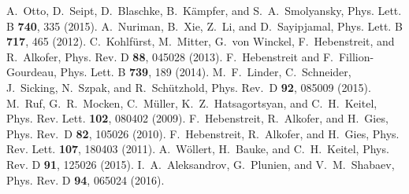 \documentclass[preprint,aps,prd,showpacs,floatfix]{revtex4-1}
\begin{document}
\begin{thebibliography}{99}
%
 A.~Otto, D.~Seipt, D.~Blaschke, B.~K\"ampfer, and S.~A.~Smolyansky, Phys. Lett. B {\bf 740}, 335 (2015).
%
 A.~Nuriman, B.~Xie, Z.~Li, and D.~Sayipjamal, Phys. Lett. B {\bf 717}, 465 (2012).
%
 C.~Kohlf\"urst, M.~Mitter, G.~von Winckel, F.~Hebenstreit, and R.~Alkofer, Phys. Rev. D {\bf 88}, 045028 (2013).
%
 F.~Hebenstreit and F.~Fillion-Gourdeau, Phys. Lett. B {\bf 739}, 189 (2014).
%
 M.~F.~Linder, C.~Schneider, J.~Sicking, N.~Szpak, and R.~Sch\"utzhold, Phys. Rev.~D {\bf 92}, 085009 (2015).
%
 M.~Ruf, G.~R.~Mocken, C.~M\"uller, K.~Z.~Hatsagortsyan, and C.~H.~Keitel, Phys. Rev. Lett. {\bf 102}, 080402 (2009).
%
  F.~Hebenstreit, R.~Alkofer, and H.~Gies, Phys. Rev.~D {\bf 82}, 105026 (2010).
%
 F.~Hebenstreit, R.~Alkofer, and H.~Gies, Phys. Rev. Lett. {\bf 107}, 180403 (2011).
%
 A.~W\"ollert, H.~Bauke, and C.~H.~Keitel, Phys. Rev. D {\bf 91}, 125026 (2015).
%
 I.~A.~Aleksandrov, G.~Plunien, and V.~M.~Shabaev, Phys. Rev. D {\bf 94}, 065024 (2016).
%

\end{thebibliography}
\end{document}

